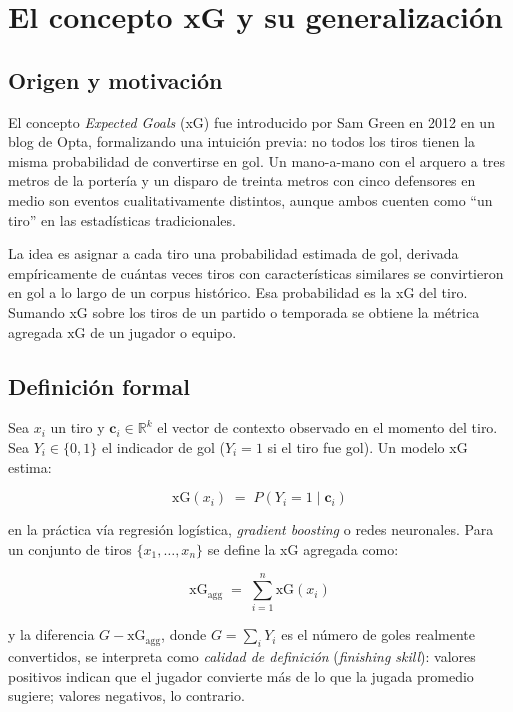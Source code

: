\section{El concepto xG y su generalización}
\label{sec:xg}

\subsection{Origen y motivación}

El concepto \emph{Expected Goals} (xG) fue introducido por Sam Green en 2012 en un blog de Opta, formalizando una intuición previa: no todos los tiros tienen la misma probabilidad de convertirse en gol. Un mano-a-mano con el arquero a tres metros de la portería y un disparo de treinta metros con cinco defensores en medio son eventos cualitativamente distintos, aunque ambos cuenten como ``un tiro'' en las estadísticas tradicionales.

La idea es asignar a cada tiro una probabilidad estimada de gol, derivada empíricamente de cuántas veces tiros con características similares se convirtieron en gol a lo largo de un corpus histórico. Esa probabilidad es la xG del tiro. Sumando xG sobre los tiros de un partido o temporada se obtiene la métrica agregada $\mathrm{xG}$ de un jugador o equipo.

\subsection{Definición formal}

Sea $x_i$ un tiro y $\mathbf{c}_i \in \mathbb{R}^k$ el vector de contexto observado en el momento del tiro. Sea $Y_i \in \{0,1\}$ el indicador de gol ($Y_i = 1$ si el tiro fue gol). Un modelo xG estima:

\[
  \mathrm{xG}(x_i) \;=\; P(Y_i = 1 \mid \mathbf{c}_i)
\]

\noindent
en la práctica vía regresión logística, \emph{gradient boosting} o redes neuronales. Para un conjunto de tiros $\{x_1,\dots,x_n\}$ se define la xG agregada como:

\[
  \mathrm{xG}_{\mathrm{agg}} \;=\; \sum_{i=1}^{n} \mathrm{xG}(x_i)
\]

\noindent
y la diferencia $G - \mathrm{xG}_{\mathrm{agg}}$, donde $G = \sum_i Y_i$ es el número de goles realmente convertidos, se interpreta como \emph{calidad de definición} (\emph{finishing skill}): valores positivos indican que el jugador convierte más de lo que la jugada promedio sugiere; valores negativos, lo contrario.

